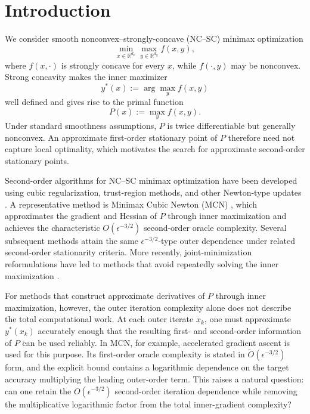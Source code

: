 \section{Introduction}
\label{sec:introduction}

We consider smooth nonconvex--strongly-concave (NC--SC) minimax
optimization
\begin{equation}
    \min_{x\in\mathbb{R}^{d_x}}
    \max_{y\in\mathbb{R}^{d_y}} f(x,y),
    \label{eq:minimax-intro}
\end{equation}
where $f(x,\cdot)$ is strongly concave for every $x$, while
$f(\cdot,y)$ may be nonconvex. Strong concavity makes the inner
maximizer
\[
    y^*(x):=\arg\max_y f(x,y)
\]
well defined and gives rise to the primal function
\[
    P(x):=\max_y f(x,y).
\]
Under standard smoothness assumptions, $P$ is twice differentiable
but generally nonconvex. An approximate first-order stationary point
of $P$ therefore need not capture local optimality, which motivates
the search for approximate second-order stationary points.

Second-order algorithms for NC--SC minimax optimization have been
developed using cubic regularization, trust-region methods, and other
Newton-type updates
\citep{luo2022finding,chen2023cubic,yao2025trust,
wang2025gradient,chen2026hsda}.
A representative method is Minimax Cubic Newton (MCN)
\citep{luo2022finding}, which approximates the gradient and Hessian of
$P$ through inner maximization and achieves the characteristic
$O(\epsilon^{-3/2})$ second-order oracle complexity. Several subsequent
methods attain the same $\epsilon^{-3/2}$-type outer dependence under
related second-order stationarity criteria. More recently,
joint-minimization reformulations have led to methods that avoid
repeatedly solving the inner maximization
\citep{ma2026linesearch,ma2026singleloop}.

For methods that construct approximate derivatives of $P$ through
inner maximization, however, the outer iteration complexity alone does
not describe the total computational work. At each outer iterate
$x_k$, one must approximate $y^*(x_k)$ accurately enough that the
resulting first- and second-order information of $P$ can be used
reliably. In MCN, for example, accelerated gradient ascent is used for
this purpose. Its first-order oracle complexity is stated in
$\widetilde O(\epsilon^{-3/2})$ form, and the explicit bound contains a
logarithmic dependence on the target accuracy multiplying the leading
outer-order term. This raises a natural question: can one retain the
$O(\epsilon^{-3/2})$ second-order iteration dependence while removing
the multiplicative logarithmic factor from the total inner-gradient
complexity?

